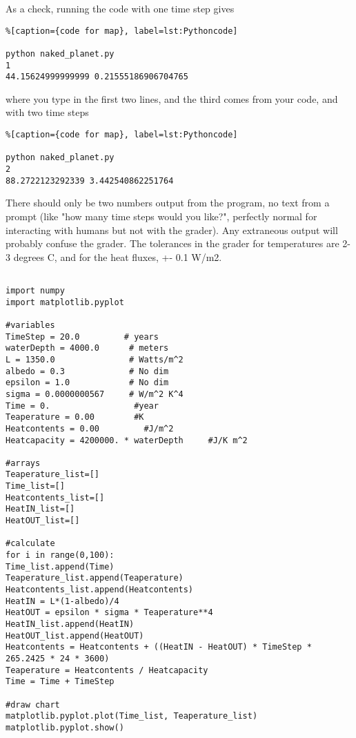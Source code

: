 As a check, running the code with one time step gives

\begin{lstlisting}%[caption={code for map}, label=lst:Pythoncode]

python naked_planet.py
1
44.15624999999999 0.21555186906704765  
\end{lstlisting}

where you type in the first two lines, and the third comes from your code, and with two time steps

\begin{lstlisting}%[caption={code for map}, label=lst:Pythoncode]

python naked_planet.py
2
88.2722123292339 3.442540862251764     
\end{lstlisting}

There should only be two numbers output from the program, no text from a prompt (like "how many time steps would you like?", perfectly normal for interacting with humans but not with the grader). Any extraneous output will probably confuse the grader. The tolerances in the grader for temperatures are 2-3 degrees C, and for the heat fluxes, +- 0.1 W/m2.

\begin{code}[흑체 복사평형 온도]
	\begin{lstlisting}
	
import numpy
import matplotlib.pyplot

#variables
TimeStep = 20.0         # years
waterDepth = 4000.0      # meters
L = 1350.0               # Watts/m^2
albedo = 0.3             # No dim
epsilon = 1.0            # No dim
sigma = 0.0000000567     # W/m^2 K^4
Time = 0.                 #year
Teaperature = 0.00        #K
Heatcontents = 0.00         #J/m^2
Heatcapacity = 4200000. * waterDepth     #J/K m^2

#arrays
Teaperature_list=[]
Time_list=[]
Heatcontents_list=[]
HeatIN_list=[]
HeatOUT_list=[]

#calculate
for i in range(0,100):
Time_list.append(Time)
Teaperature_list.append(Teaperature)
Heatcontents_list.append(Heatcontents)
HeatIN = L*(1-albedo)/4
HeatOUT = epsilon * sigma * Teaperature**4
HeatIN_list.append(HeatIN)
HeatOUT_list.append(HeatOUT)
Heatcontents = Heatcontents + ((HeatIN - HeatOUT) * TimeStep * 265.2425 * 24 * 3600)
Teaperature = Heatcontents / Heatcapacity
Time = Time + TimeStep

#draw chart
matplotlib.pyplot.plot(Time_list, Teaperature_list)
matplotlib.pyplot.show()
	
	\end{lstlisting}
\end{code}

